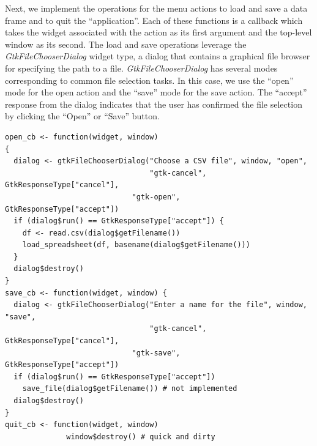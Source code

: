 \documentclass[article]{jss}
\begin{document}
Next, we implement the operations for the menu actions to load and
save a data frame and to quit the ``application''. Each of these
functions is a callback which takes the widget associated with the
action as its first argument and the top-level window as its
second. The load and save operations leverage the
\emph{GtkFileChooserDialog} widget type, a dialog that contains a
graphical file browser for specifying the path to a
file. \emph{GtkFileChooserDialog} has several modes corresponding to
common file selection tasks. In this case, we use the ``open'' mode
for the open action and the ``save'' mode for the save action. The
``accept'' response from the dialog indicates that the user has
confirmed the file selection by clicking the ``Open'' or ``Save''
button.
\begin{verbatim}
open_cb <- function(widget, window)  
{
  dialog <- gtkFileChooserDialog("Choose a CSV file", window, "open",
                                 "gtk-cancel",
GtkResponseType["cancel"],
	      	                 "gtk-open",
GtkResponseType["accept"])
  if (dialog$run() == GtkResponseType["accept"]) {
    df <- read.csv(dialog$getFilename())
    load_spreadsheet(df, basename(dialog$getFilename()))
  }
  dialog$destroy()
}
save_cb <- function(widget, window) {
  dialog <- gtkFileChooserDialog("Enter a name for the file", window,
"save",
                                 "gtk-cancel",
GtkResponseType["cancel"],
          	                 "gtk-save",
GtkResponseType["accept"])
  if (dialog$run() == GtkResponseType["accept"])
    save_file(dialog$getFilename()) # not implemented
  dialog$destroy()
}
quit_cb <- function(widget, window) 
              window$destroy() # quick and dirty

\end{verbatim}
\end{document}
